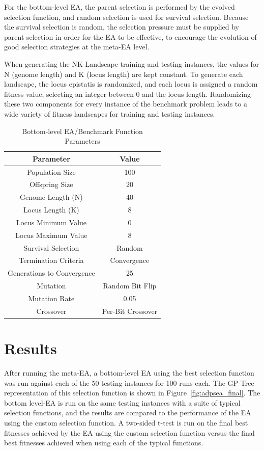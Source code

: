 \documentclass[sigconf]{acmart}
\begin{document}
For the bottom-level EA, the parent selection is performed by the evolved selection function, and random selection is used for survival selection. Because the survival selection is random, the selection pressure must be supplied by parent selection in order for the EA to be effective, to encourage the evolution of good selection strategies at the meta-EA level.

When generating the NK-Landscape training and testing instances, the values for N (genome length) and K (locus length) are kept constant. To generate each landscape, the locus epistatis is randomized, and each locus is assigned a random fitness value, selecting an integer between 0 and the locus length. Randomizing these two components for every instance of the benchmark problem leads to a wide variety of fitness landscapes for training and testing instances.

\begin{table}
  \caption{Bottom-level EA/Benchmark Function Parameters}
  \label{tab:basicEA_params}
  \begin{tabular}{cc}
    \toprule
    Parameter & Value\\
    \midrule
    Population Size & 100 \\
    Offspring Size & 20\\
    Genome Length (N) & 40 \\
    Locus Length (K) & 8\\
    Locus Minimum Value & 0\\
    Locus Maximum Value & 8\\
    Survival Selection & Random \\
    Termination Criteria & Convergence \\
    Generations to Convergence & 25\\
    Mutation & Random Bit Flip \\
    Mutation Rate & 0.05\\
    Crossover & Per-Bit Crossover\\
	
  \bottomrule
\end{tabular}
\end{table}

\section{Results}
\label{Results}

After running the meta-EA, a bottom-level EA using the best selection function was run against each of the 50 testing instances for 100 runs each. The GP-Tree representation of this selection function is shown in Figure~\ref{fig:adpsea_final}. The bottom level-EA is run on the same testing instances with a suite of typical selection functions, and the results are compared to the performance of the EA using the custom selection function. A two-sided t-test is run on the final best fitnesses achieved by the EA using the custom selection function versus the final best fitnesses achieved when using each of the typical functions. 
\end{document}

